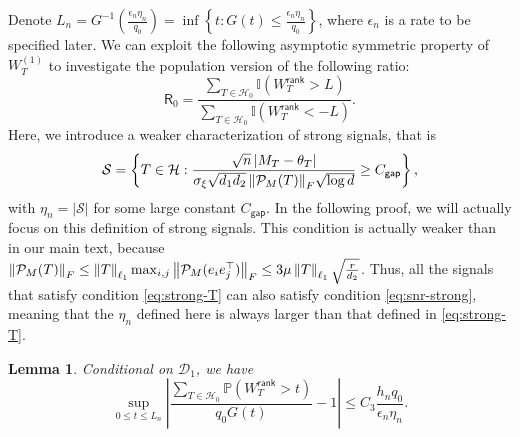 \documentclass[12pt]{article}
\newcommand{\tF}{{\rm F}}
\newcommand{\abs}[1]{\left\lvert#1\right\rvert}
\newcommand{\norm}[1]{\left\lVert#1\right\rVert}
\newcommand{\PP}{\mathbb{P}}
\newcommand{\cH}{\mathcal{H}}
\newcommand{\cP}{\mathcal{P}}
\newcommand{\cD}{\mathcal{D}}
\newcommand{\cS}{\mathcal{S}}
\newcommand{\bbI}{\mathbb{I}}
\def\PP{{\mathbb P}}
\newcommand{\sfR}{{\mathsf{R}}}
\newtheorem{Lemma}{Lemma}
\theoremstyle{plain}
\begin{document}
Denote $L_n= G^{-1}( \frac{\epsilon_n \eta_n}{q_0})= \inf\left\{t:G(t)\le \frac{\epsilon_n \eta_n}{q_0}\right\}$, where $\epsilon_n$ is a rate to be specified later. We can exploit the following asymptotic symmetric property of ${W}^{(1)}_{T}$ to investigate the population version of the following ratio:
\begin{equation*}
    \sfR_0=\frac{\sum_{T\in \cH_0  } \bbI(W_T^{\mathsf{rank}} >L ) }{ \sum_{T\in \cH_0  } \bbI(W_T^{\mathsf{rank}} <-L )}.
\end{equation*}
Here, we introduce a weaker characterization of strong signals, that is 
 \begin{equation}\label{eq:snr-strong}
        \cS = \left\{ T\in \cH: \frac{  \sqrt{n} \abs{M_T-\theta_T } }{ {\sigma_\xi \sqrt{d_1 d_2}\norm{\cP_M(T) }_{\tF} }  \sqrt{\log d } } \ge C_{\mathsf{gap} } \right\},
    \end{equation}   
    with $\eta_n=\abs{\cS}$ for some large constant $C_{\mathsf{gap} }$. In the following proof, we will actually focus on this definition of strong signals. This condition is actually weaker than in our main text, because $\norm{\cP_M(T)}_{\tF} \le \norm{T}_{\ell_1} \max_{i,j}\norm{ \cP_M(e_i e_j^\top) }_{\tF} \le 3 {\mu} \norm{T}_{\ell_1} \sqrt{\frac{r}{d_2} }$. Thus, all the signals that satisfy condition \eqref{eq:strong-T} can also satisfy condition \eqref{eq:snr-strong}, meaning that the $\eta_n$ defined here is always larger than that defined in \eqref{eq:strong-T}.

\begin{Lemma}\label{lemma:pop-wrank}  Conditional on $\cD_1$, we have
\begin{equation*}
    \sup\limits_{0\le t \le L_n} \abs{\frac{ \sum_{T\in\cH_0}\PP(W_T^\mathsf{rank} >t ) }{q_0 G(t) } -1 }\le C_3 \frac{h_n q_0}{\epsilon_n \eta_n }.
\end{equation*}
\end{Lemma}
\end{document}
